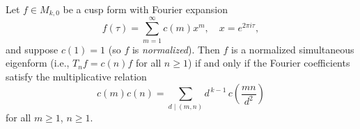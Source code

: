 Let $f \in M_{k,0}$ be a cusp form with Fourier expansion
$$f(\tau) = \sum_{m=1}^{\infty} c(m)x^m, \quad x = e^{2\pi i\tau},$$
and suppose $c(1) = 1$ (so $f$ is \textit{normalized}). Then $f$ is a normalized simultaneous eigenform (i.e., $T_n f = c(n) f$ for all $n \geq 1$) if and only if the Fourier coefficients satisfy the multiplicative relation
$$c(m)c(n) = \sum_{d \mid (m,n)} d^{\,k-1} \, c\!\left(\frac{mn}{d^2}\right)$$
for all $m \geq 1$, $n \geq 1$.
